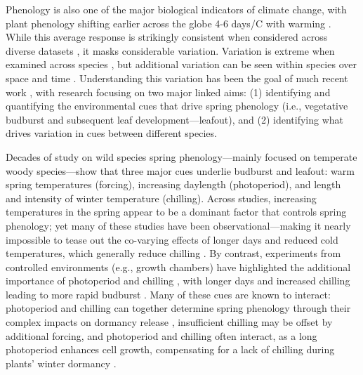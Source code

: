 \documentclass[11pt]{article}
\begin{document}
Phenology is also one of the major biological indicators of climate change, with plant phenology shifting earlier across the globe 4-6 days/\degree C with warming \citep{IPCC:2014sm}. While this average response is strikingly consistent when considered across diverse datasets \citep{Wolkovich:2012aa}, it masks considerable variation. Variation is extreme when examined across species \citep{Wolkovich:2014ab}, but additional variation can be seen within species over space \citep{vitasselev,kramer2017} and time \citep{yu2010,fu2015}. Understanding this variation has been the goal of much recent work \citep{Rutishauser:2008fu,Laube2015,donnelly2017,zohner2017}, with research focusing on two major linked aims: (1) identifying and quantifying the environmental cues that drive spring phenology (i.e., vegetative budburst and subsequent leaf development---leafout), and (2) identifying what drives variation in cues between different species.

Decades of study on wild species spring phenology---mainly focused on temperate woody species---show that three major cues underlie budburst and leafout: warm spring temperatures (forcing), increasing daylength (photoperiod), and length and intensity of winter temperature (chilling). Across studies, increasing temperatures in the spring appear to be a dominant factor that controls spring phenology; yet many of these studies have been observational---making it nearly impossible to tease out the co-varying effects of longer days and reduced cold temperatures, which generally reduce chilling \citep{chuineJTB,Cook:2012pnas}. By contrast, experiments from controlled environments (e.g., growth chambers) have highlighted the additional importance of photoperiod and chilling \citep{Heide:1993b,Falusi:1996aa,Foley:2009aa,Ghelardini:2010aa,Caffarra:2011aa}, with longer days and increased chilling leading to more rapid budburst \citep{Caffarra:2011ab}. Many of these cues are known to interact: photoperiod and chilling can together determine spring phenology through their complex impacts on dormancy release \citep{chuineJTB}, insufficient chilling may be offset by additional forcing, and photoperiod and chilling often interact, as a long photoperiod enhances cell growth, compensating for a lack of chilling during plants' winter dormancy \citep{Heide:1993b,Myking:1995,Caffarra:2011aa}.
\end{document}
